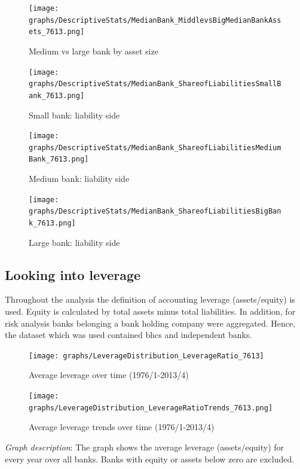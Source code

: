 \documentclass[12pt, a4paper]{article} %
\begin{document}
\begin{figure}[hbtp]
\centering
\caption{Medium vs large bank by asset size}
\texttt{[image: graphs/DescriptiveStats/MedianBank\_MiddlevsBigMedianBankAssets\_7613.png]}
\end{figure}


\begin{figure}[hbtp]
\centering
\caption{Small bank: liability side}
\texttt{[image: graphs/DescriptiveStats/MedianBank\_ShareofLiabilitiesSmallBank\_7613.png]}
\end{figure}


\begin{figure}[hbtp]
\centering
\caption{Medium bank: liability side}
\texttt{[image: graphs/DescriptiveStats/MedianBank\_ShareofLiabilitiesMediumBank\_7613.png]}
\end{figure}


\begin{figure}[hbtp]
\centering
\caption{Large bank: liability side}
\texttt{[image: graphs/DescriptiveStats/MedianBank\_ShareofLiabilitiesBigBank\_7613.png]}
\end{figure}



\newpage

\subsection{Looking into leverage}

Throughout the analysis the definition of accounting leverage (assets/equity) is used. Equity is calculated by total assets minus total liabilities. In addition, for risk analysis banks belonging a bank holding company were aggregated. Hence, the dataset which was used contained bhcs and independent banks.

\begin{figure}[hbtp]
\centering
\caption{Average leverage over time (1976/1-2013/4)}
\texttt{[image: graphs/LeverageDistribution\_LeverageRatio\_7613]}
\end{figure}

\begin{figure}[hbtp]
\centering
\caption{Average leverage trends over time (1976/1-2013/4)}
\texttt{[image: graphs/LeverageDistribution\_LeverageRatioTrends\_7613.png]}
\end{figure}

\noindent \textit{Graph description}: The graph shows the average leverage (assets/equity) for every year over all banks. Banks with equity or assets below zero are excluded.
\end{document}
